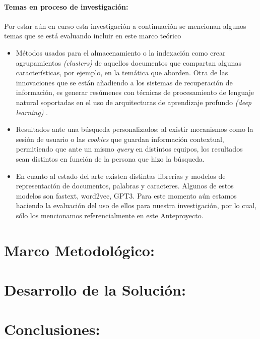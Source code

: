 \documentclass[
  10,
  openany]{book}
\begin{document}
\hypertarget{temas-en-proceso-de-investigaciuxf3n}{%
\subsubsection{Temas en proceso de investigación:}\label{temas-en-proceso-de-investigaciuxf3n}}

Por estar aún en curso esta investigación a continuación se mencionan algunos temas que se está evaluando incluir en este marco teórico

\begin{itemize}
\item
  Métodos usados para el almacenamiento o la indexación como crear agrupamientos \emph{(clusters)} de aquellos documentos que compartan algunas características, por ejemplo, en la temática que aborden. Otra de las innovaciones que se están añadiendo a los sistemas de recuperación de información, es generar resúmenes con técnicas de procesamiento de lenguaje natural soportadas en el uso de arquitecturas de aprendizaje profundo \emph{(deep learning)} .
\item
  Resultados ante una búsqueda personalizados: al existir mecanismos como la sesión de usuario o las \emph{cookies} que guardan información contextual, permitiendo que ante un mismo \emph{query} en distintos equipos, los resultados sean distintos en función de la persona que hizo la búsqueda.
\item
  En cuanto al estado del arte existen distintas librerías y modelos de representación de documentos, palabras y caracteres. Algunos de estos modelos son fastext, word2vec, GPT3. Para este momento aún estamos haciendo la evaluación del uso de ellos para nuestra investigación, por lo cual, sólo los mencionamos referencialmente en este Anteproyecto.
\end{itemize}

\hypertarget{metodologuxeda}{%
\chapter{Marco Metodológico:}\label{metodologuxeda}}

\hypertarget{desarrollo}{%
\chapter{Desarrollo de la Solución:}\label{desarrollo}}

\hypertarget{conclusiones}{%
\chapter{Conclusiones:}\label{conclusiones}}

  
\end{document}
